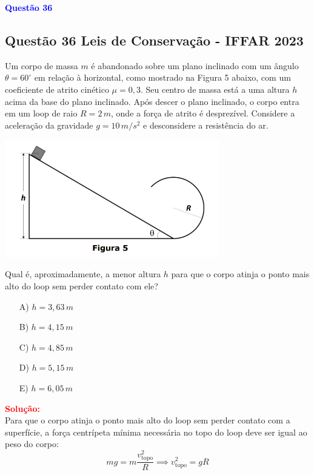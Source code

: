 \begin{flushleft}
\textbf{\textcolor{blue}{\Large Quest\~ao 36}}\\
\noindent
\subsection{Quest\~ao 36 Leis de Conserva\c{c}\~ao - IFFAR 2023}
Um corpo de massa $m$ é abandonado sobre um plano inclinado com um ângulo 
$\theta = 60^\circ$ em relação à horizontal, como mostrado na Figura 5 abaixo, 
com um coeficiente de atrito cinético $\mu = 0{,}3$. Seu centro de massa está 
a uma altura $h$ acima da base do plano inclinado. Após descer o plano inclinado, 
o corpo entra em um loop de raio $R = 2\,m$, onde a força de atrito é desprezível. 
Considere a aceleração da gravidade $g = 10\,m/s^2$ e desconsidere a resistência do ar.

\begin{center}
\includegraphics[width=0.7\textwidth]{figures/loop.png} \\[0.3cm]
\end{center}

Qual é, aproximadamente, a menor altura $h$ para que o corpo atinja o ponto mais 
alto do loop sem perder contato com ele?

\begin{itemize}
\item[A)] $h = 3{,}63\,m$
\item[B)] $h = 4{,}15\,m$
\item[C)] $h = 4{,}85\,m$
\item[D)] $h = 5{,}15\,m$
\item[E)] $h = 6{,}05\,m$
\end{itemize}

\vspace{0.5cm}

\textcolor{red}{\textbf{Solução:}}\\

Para que o corpo atinja o ponto mais alto do loop sem perder contato com a superfície, a força centrípeta mínima necessária no topo do loop deve ser igual ao peso do corpo:
\[
m g = m \frac{v_{\text{topo}}^2}{R} \implies v_{\text{topo}}^2 = gR
\]


\end{flushleft}
